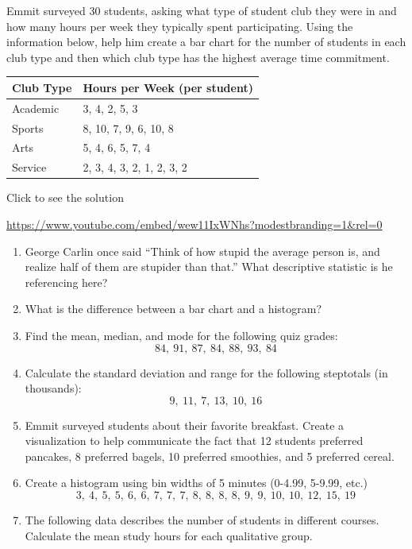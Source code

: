 \documentclass[
  letterpaper,
  DIV=11,
  numbers=noendperiod]{scrreprt}
\begin{document}
\begin{tcolorbox}[enhanced jigsaw, colframe=quarto-callout-tip-color-frame, colback=white, breakable, rightrule=.15mm, title=\textcolor{quarto-callout-tip-color}{\faLightbulb}\hspace{0.5em}{Try it Out}, bottomtitle=1mm, toptitle=1mm, titlerule=0mm, left=2mm, coltitle=black, colbacktitle=quarto-callout-tip-color!10!white, leftrule=.75mm, opacitybacktitle=0.6, bottomrule=.15mm, opacityback=0, arc=.35mm, toprule=.15mm]

Emmit surveyed 30 students, asking what type of student club they were
in and how many hours per week they typically spent participating. Using
the information below, help him create a bar chart for the number of
students in each club type and then which club type has the highest
average time commitment.

\begin{longtable}[]{@{}ll@{}}
\toprule\noalign{}
Club Type & Hours per Week (per student) \\
\midrule\noalign{}
\endhead
\bottomrule\noalign{}
\endlastfoot
Academic & 3, 4, 2, 5, 3 \\
Sports & 8, 10, 7, 9, 6, 10, 8 \\
Arts & 5, 4, 6, 5, 7, 4 \\
Service & 2, 3, 4, 3, 2, 1, 2, 3, 2 \\
\end{longtable}

Click to see the solution

\url{https://www.youtube.com/embed/wew11IxWNhs?modestbranding=1&rel=0}

\end{tcolorbox}

\begin{enumerate}
\def\labelenumi{\arabic{enumi})}
\item
  George Carlin once said ``Think of how stupid the average person is,
  and realize half of them are stupider than that.'' What descriptive
  statistic is he referencing here?
\item
  What is the difference between a bar chart and a histogram?
\item
  Find the mean, median, and mode for the following quiz grades:
  \[ 84,\ 91,\ 87,\ 84,\ 88,\ 93,\ 84\]
\item
  Calculate the standard deviation and range for the following
  steptotals (in thousands): \[9,\ 11,\ 7,\ 13,\ 10,\ 16\]
\item
  Emmit surveyed students about their favorite breakfast. Create a
  visualization to help communicate the fact that 12 students preferred
  pancakes, 8 preferred bagels, 10 preferred smoothies, and 5 preferred
  cereal.
\item
  Create a histogram using bin widths of 5 minutes (0-4.99, 5-9.99,
  etc.)
  \[3,\ 4,\ 5,\ 5,\ 6,\ 6,\ 7,\ 7,\ 7,\ 8,\ 8,\ 8,\ 8,\ 9,\ 9,\ 10,\ 10,\ 12,\ 15,\ 19\]
\item
  The following data describes the number of students in different
  courses. Calculate the mean study hours for each qualitative group.
\end{enumerate}
\end{document}
